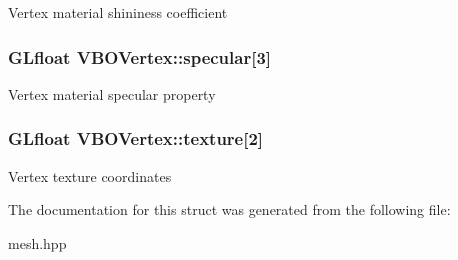 Vertex material shininess coefficient \hypertarget{structVBOVertex_a35725f03472cebdfea1aaa98dac0aa1b}{
\subsubsection[{specular}]{\setlength{\rightskip}{0pt plus 5cm}G\-Lfloat V\-B\-O\-Vertex\-::specular\mbox{[}3\mbox{]}}}\label{structVBOVertex_a35725f03472cebdfea1aaa98dac0aa1b}
Vertex material specular property \hypertarget{structVBOVertex_a66eb5e96270293ec950bbd9fe1773424}{
\subsubsection[{texture}]{\setlength{\rightskip}{0pt plus 5cm}G\-Lfloat V\-B\-O\-Vertex\-::texture\mbox{[}2\mbox{]}}}\label{structVBOVertex_a66eb5e96270293ec950bbd9fe1773424}
Vertex texture coordinates 

The documentation for this struct was generated from the following file\-:\begin{DoxyCompactItemize}
\item 
mesh.\-hpp\end{DoxyCompactItemize}
